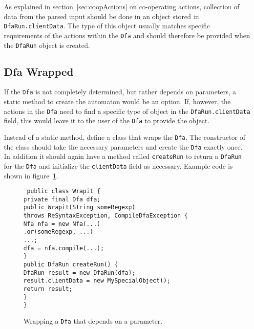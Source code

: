 \documentclass[12pt,a4paper,halfparskip]{scrartcl}
\newenvironment{codexa}%
{\begin{lrbox}{\codebox}\begin{minipage}{0.85\textwidth}\small\tt}
{\end{minipage}\end{lrbox}\begin{center}\setlength{\fboxrule}{1pt}\setlength{\fboxsep}{1em}\fcolorbox{codexab}{codexa}{\usebox{\codebox}}\end{center}}
\newcommand{\code}[1]{\texttt{#1}}
\newcommand{\T}{\hspace*{2ex}}
\begin{document}
As explained in section~\ref{sec:coopActions} on co-operating actions,
collection of data from the parsed input should be done in an object
stored in \code{DfaRun.clientData}. The type of this object usually
matches specific requirements of the actions within the \code{Dfa} and
should therefore be provided when the \code{DfaRun} object is created.

\subsection{Dfa Wrapped}
If the \code{Dfa} is not completely determined, but rather depends on
parameters, a static method to create the automaton would be an
option. If, however, the actions in the \code{Dfa} need to find a
specific type of object in the \code{DfaRun.clientData} field, this
would leave it to the user of the \code{Dfa} to provide the object.

Instead of a static method, define a class that wraps the \code{Dfa}.
The constructor of the class should take the necessary parameters and
create the \code{Dfa} exactly once. In addition it should again have a
method called \code{createRun} to return a \code{DfaRun} for the
\code{Dfa} and initialize the \code{clientData} field as
necessary. Example code is shown in figure~\ref{fig:wrapit}.

\begin{figure}
\begin{codexa}
  public class Wrapit \{\\
  \T private final Dfa dfa;\\
  \T public Wrapit(String someRegexp)\\
  \T\T throws ReSyntaxException, CompileDfaException \{
\\
  \T\T Nfa nfa = new Nfa(...)\\
  \T\T\T .or(someRegexp, ...)\\
  \T\T\T ...;\\
  \T\T dfa = nfa.compile(...);\\
  \T\}\\
  \T public DfaRun createRun() \{\\
  \T\T DfaRun result = new DfaRun(dfa);\\
  \T\T result.clientData = new MySpecialObject();\\
  \T\T return result;\\
  \T \}\\
\}
\end{codexa}
\caption{Wrapping a \code{Dfa} that depends on a
  parameter.}\label{fig:wrapit}
\end{figure}
\end{document}
